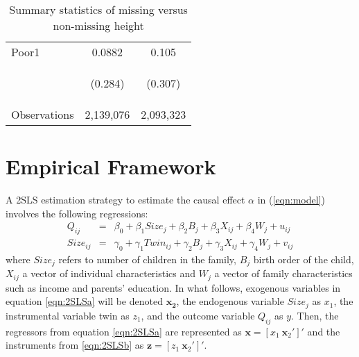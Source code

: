 \documentclass{article}[11pt,subeqn]
\newcommand{\vect}[1]{\mathbf{#1}}
\begin{document}
\begin{spacing}{1.25}
\begin{table}[ht]
\begin{center}
\begin{tabular}{lcc}
Poor1 & 0.0882 & 0.105\\
\begin{footnotesize}\end{footnotesize} & \begin{footnotesize}(0.284)\end{footnotesize} & \begin{footnotesize}(0.307)\end{footnotesize} \\ \midrule
Observations & 2,139,076 &  2,093,323  \\ \bottomrule
\end{tabular}
\caption{Summary statistics of missing versus non-missing height}
\label{tab:missing}
\end{center}
\end{table}


\section{Empirical Framework}
A 2SLS estimation strategy to estimate the causal effect $\alpha$ in (\ref{eqn:model}) involves the following
regressions:
\begin{subequations}
\label{eqn:2SLS}
\begin{eqnarray}
Q_{ij}&=&\beta_0+\beta_1Size_j+\beta_2B_{j}+\beta_3X_{ij}+\beta_4W_j+u_{ij} \label{eqn:2SLSa}\\
Size_{ij}&=&\gamma_0+\gamma_1Twin_{ij}+\gamma_2B_{j}+\gamma_3X_{ij}+\gamma_4W_j+v_{ij} \label{eqn:2SLSb}
 \end{eqnarray}
\end{subequations}
where $Size_j$ refers to number of children in the family, $B_j$ birth order of the child, $X_{ij}$ a vector
of individual characteristics and $W_j$ a vector of family characteristics such as income and parents' education.
In what follows, exogenous variables in equation \ref{eqn:2SLSa} will be denoted $\mathbf{x_2}$, the
endogenous variable $Size_j$ as $x_1$, the instrumental variable twin as $z_1$, and the outcome variable
$Q_{ij}$ as $y$.  Then, the regressors from equation \ref{eqn:2SLSa} are represented as
$\vect{x}=[x_1\ \vect{x}_2']'$ and the instruments from \ref{eqn:2SLSb} as $\vect{z}=[z_1\ \vect{x}_2']'$.


\end{spacing}
\end{document}

